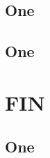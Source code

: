 \documentclass[11pt]{beamer}
\begin{document}
\begin{frame}
	\subsection{One}
	\frametitle{}
\end{frame}

\begin{frame}
	\subsection{One}
	\frametitle{}
\end{frame}
%
	\section{FIN}
\begin{frame}
	\subsection{One}
	\frametitle{}
\end{frame}
\end{document}
